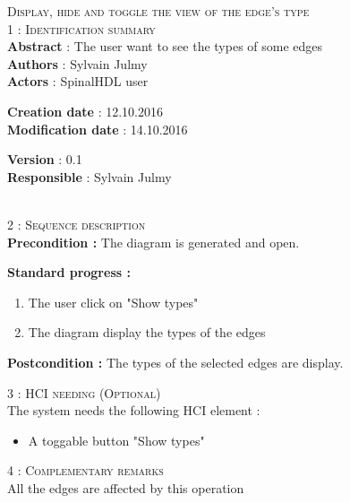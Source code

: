 \begin{flushleft}
    \textsc{\huge Display, hide and toggle the view of the edge's type}\\[0.5cm]

    \BlackLine
    \textsc{\Large 1 : Identification summary}\\[0.3cm]

        \textbf{\large Abstract} : The user want to see the types of some edges\\[0.1cm]

        \textbf{\large Authors} : Sylvain Julmy \\[0.3cm]			

        \textbf{\large Actors} : SpinalHDL user \\[0.1cm]	
    \begin{minipage}{0.40\textwidth}
        \begin{flushleft}	
            \textbf{\large Creation date} : 12.10.2016 \\[0.1cm]

            \textbf{\large Modification date} : 14.10.2016 \\[0.1cm]
        \end{flushleft}
    \end{minipage}
    \begin{minipage}{0.40\textwidth}
        \begin{flushleft}
            \textbf{\large Version} : 0.1 \\[0.1cm]

            \textbf{\large Responsible} : Sylvain Julmy \\[0.1cm]
        \end{flushleft}
    \end{minipage}
    \\[0.5cm]
    \BlackLine
    \textsc{\Large 2 : Sequence description}\\[0.3cm]

    \textbf{\large Precondition :} The diagram is generated and open.

    \textbf{\large  Standard progress :}
    \begin{enumerate}[nosep]
        \item The user click on "Show types"
        \item The diagram display the types of the edges
    \end{enumerate}

    \textbf{\large Postcondition :} The types of the selected edges are display.

    \BlackLine
    \textsc{\Large 3 : HCI needing (Optional)}\\[0.3cm]
    The system needs the following HCI element :
    \begin{itemize}
        \item A toggable button "Show types"
    \end{itemize}

    \BlackLine
    \textsc{\Large 4 : Complementary remarks}\\[0.3cm]

    All the edges are affected by this operation

\end{flushleft}
